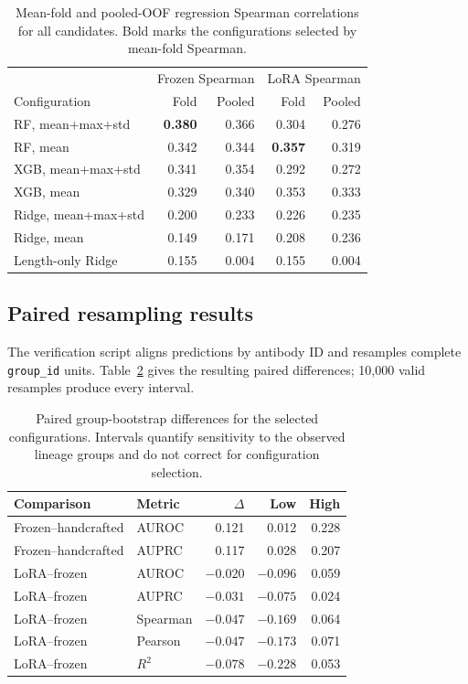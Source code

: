 \begin{table}[!htbp]
\centering
\scriptsize
\setlength{\tabcolsep}{3pt}
\begin{tabular}{lrrrr}
\toprule
& \multicolumn{2}{c}{Frozen Spearman} &
\multicolumn{2}{c}{LoRA Spearman} \\
Configuration & Fold & Pooled & Fold & Pooled \\
\midrule
RF, mean+max+std & \textbf{0.380} & 0.366 & 0.304 & 0.276 \\
RF, mean & 0.342 & 0.344 & \textbf{0.357} & 0.319 \\
XGB, mean+max+std & 0.341 & 0.354 & 0.292 & 0.272 \\
XGB, mean & 0.329 & 0.340 & 0.353 & 0.333 \\
Ridge, mean+max+std & 0.200 & 0.233 & 0.226 & 0.235 \\
Ridge, mean & 0.149 & 0.171 & 0.208 & 0.236 \\
Length-only Ridge & 0.155 & 0.004 & 0.155 & 0.004 \\
\bottomrule
\end{tabular}
\caption{Mean-fold and pooled-OOF regression Spearman correlations for all
candidates. Bold marks the configurations selected by mean-fold Spearman.}
\label{tab:all_regression}
\end{table}

\subsection{Paired resampling results}

The verification script aligns predictions by antibody ID and resamples complete
\texttt{group\_id} units. Table~\ref{tab:paired_deltas} gives the resulting
paired differences; 10,000 valid resamples produce every interval.

\begin{table}[!htbp]
\centering
\scriptsize
\setlength{\tabcolsep}{4pt}
\begin{tabular}{llrrr}
\toprule
Comparison & Metric & $\Delta$ & Low & High \\
\midrule
Frozen--handcrafted & AUROC & 0.121 & 0.012 & 0.228 \\
Frozen--handcrafted & AUPRC & 0.117 & 0.028 & 0.207 \\
LoRA--frozen & AUROC & $-0.020$ & $-0.096$ & 0.059 \\
LoRA--frozen & AUPRC & $-0.031$ & $-0.075$ & 0.024 \\
LoRA--frozen & Spearman & $-0.047$ & $-0.169$ & 0.064 \\
LoRA--frozen & Pearson & $-0.047$ & $-0.173$ & 0.071 \\
LoRA--frozen & $R^2$ & $-0.078$ & $-0.228$ & 0.053 \\
\bottomrule
\end{tabular}
\caption{Paired group-bootstrap differences for the selected configurations.
Intervals quantify sensitivity to the observed lineage groups and do not
correct for configuration selection.}
\label{tab:paired_deltas}
\end{table}

